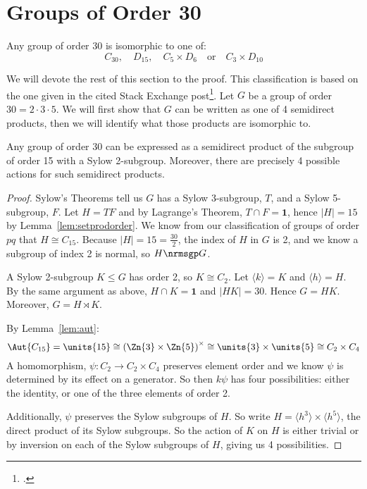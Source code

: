 \section{Groups of Order 30}
\begin{theorem}\label{thm:30}
    Any group of order 30 is isomorphic to one of:
    \[
        C_{30}, \quad%
        D_{15}, \quad%
        C_5 \times D_6 \quad \text{or} \quad%
        C_3 \times D_{10}
    \]
\end{theorem}

We will devote the rest of this section to the proof.
This classification is based on the one given in the cited Stack Exchange post\footcite{order30}.
Let \(G\) be a group of order \(30 = 2 \cdot 3 \cdot 5\).
We will first show that \(G\) can be written as one of 4 semidirect products, then we will identify what those products
are isomorphic to.

\begin{lemma}\label{lem:order_30_actions}
    Any group of order 30 can be expressed as a semidirect product of the subgroup of order 15 with a Sylow 2-subgroup.
    Moreover, there are precisely 4 possible actions for such semidirect products.
\end{lemma}

\begin{proof}
    Sylow's Theorems tell us \(G\) has a Sylow 3-subgroup, \(T\), and a Sylow 5-subgroup, \(F\).
    Let \(H = TF\) and by Lagrange's Theorem, \(T \cap F = \bm{1}\), hence \(|H| = 15\) by Lemma~\ref{lem:setprodorder}.
    We know from our classification of groups of order \(pq\) that \(H \cong C_{15}\).
    Because \(|H| = 15 = \frac{30}{2}\), the index of \(H\) in \(G\) is 2, and we know a subgroup of index 2 is normal,
    so \(H \nrmsgp G\).

    A Sylow 2-subgroup \(K \leqslant G\) has order 2, so \(K \cong C_2\).
    Let \(\langle k \rangle = K\) and \(\langle h \rangle = H\).
    By the same argument as above, \(H \cap K = \bm{1}\) and \(|HK| = 30\).
    Hence \(G = HK\).
    Moreover, \(G = H \rtimes K\).

    By Lemma~\ref{lem:aut}:
    \[\Aut{C_{15}} = \units{15} \cong {(\Zn{3} \times \Zn{5})}^\times \cong \units{3} \times \units{5} \cong C_2 \times C_4\]
    A homomorphism, \(\psi:C_2 \to C_2 \times C_4\) preserves element order and we know \(\psi\) is determined by its
    effect on a generator.
    So then \(k\psi\) has four possibilities: either the identity, or one of the three elements
    of order 2.

    Additionally, \(\psi\) preserves the Sylow subgroups of \(H\).
    So write \(H = \langle h^3 \rangle \times \langle h^5 \rangle\), the direct product of its Sylow subgroups.
    So the action of \(K\) on \(H\) is either trivial or by inversion on each of the Sylow subgroups of \(H\), giving us 4
    possibilities.
\end{proof}

